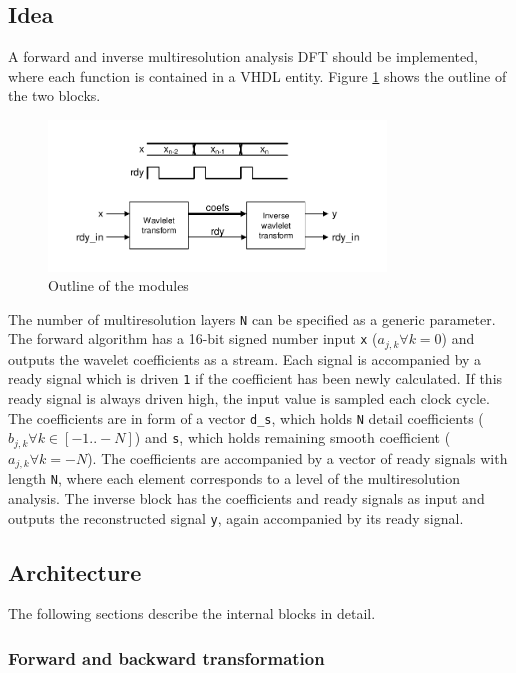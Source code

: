 \begin{refsection}
\subsection{Idea}

A forward and inverse multiresolution analysis DFT should be implemented, where each function is contained in a VHDL entity.
Figure \ref{fpga:fig:idea} shows the outline of the two blocks.
\begin{figure}
	\centering
	\includegraphics[width=0.8\textwidth]{papers/fpga/images/idea.pdf}
	\caption{Outline of the modules \label{fpga:fig:idea}}
\end{figure}
The number of multiresolution layers \texttt{N} can be specified as a generic parameter.
The forward algorithm has a 16-bit signed number input \texttt{x} ($a_{j,k} \forall k=0$) and outputs the wavelet coefficients as a stream.
Each signal is accompanied by a ready signal which is driven \texttt{1} if the coefficient has been newly calculated.
If this ready signal is always driven high, the input value is sampled each clock cycle.
The coefficients are in form of a vector \texttt{d\_s}, which holds \texttt{N} detail coefficients ($b_{j,k} \forall k \in [-1 .. -N]$) and \texttt{s}, which holds remaining smooth coefficient ($a_{j,k} \forall k=-N$).
The coefficients are accompanied by a vector of ready signals with length \texttt{N}, where each element corresponds to a level of the multiresolution analysis.
The inverse block has the coefficients and ready signals as input and outputs the reconstructed signal \texttt{y}, again accompanied by its ready signal.

\subsection{Architecture}
The following sections describe the internal blocks in detail.





\subsubsection{Forward and backward transformation}



\end{refsection}
